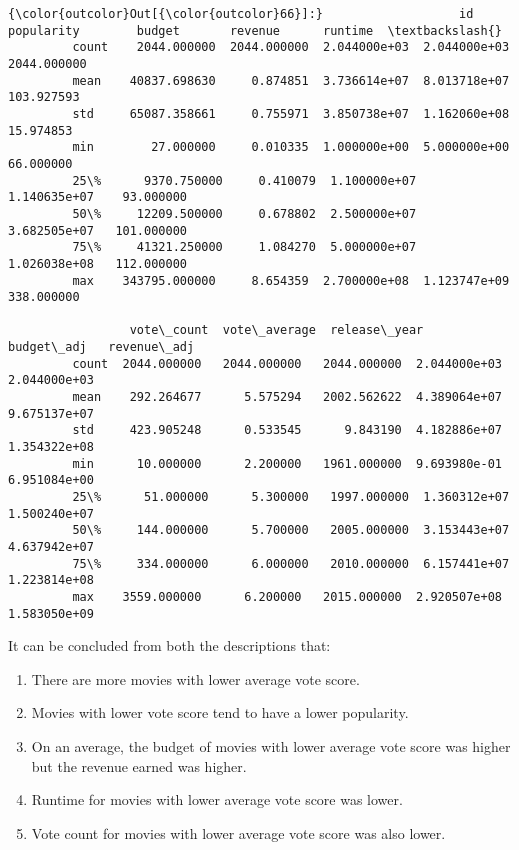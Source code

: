 \documentclass[11pt]{article}
\providecommand{\tightlist}{%
      \setlength{\itemsep}{0pt}\setlength{\parskip}{0pt}}
\begin{document}
\begin{Verbatim}[commandchars=\\\{\}]
{\color{outcolor}Out[{\color{outcolor}66}]:}                   id   popularity        budget       revenue      runtime  \textbackslash{}
         count    2044.000000  2044.000000  2.044000e+03  2.044000e+03  2044.000000   
         mean    40837.698630     0.874851  3.736614e+07  8.013718e+07   103.927593   
         std     65087.358661     0.755971  3.850738e+07  1.162060e+08    15.974853   
         min        27.000000     0.010335  1.000000e+00  5.000000e+00    66.000000   
         25\%      9370.750000     0.410079  1.100000e+07  1.140635e+07    93.000000   
         50\%     12209.500000     0.678802  2.500000e+07  3.682505e+07   101.000000   
         75\%     41321.250000     1.084270  5.000000e+07  1.026038e+08   112.000000   
         max    343795.000000     8.654359  2.700000e+08  1.123747e+09   338.000000   
         
                 vote\_count  vote\_average  release\_year    budget\_adj   revenue\_adj  
         count  2044.000000   2044.000000   2044.000000  2.044000e+03  2.044000e+03  
         mean    292.264677      5.575294   2002.562622  4.389064e+07  9.675137e+07  
         std     423.905248      0.533545      9.843190  4.182886e+07  1.354322e+08  
         min      10.000000      2.200000   1961.000000  9.693980e-01  6.951084e+00  
         25\%      51.000000      5.300000   1997.000000  1.360312e+07  1.500240e+07  
         50\%     144.000000      5.700000   2005.000000  3.153443e+07  4.637942e+07  
         75\%     334.000000      6.000000   2010.000000  6.157441e+07  1.223814e+08  
         max    3559.000000      6.200000   2015.000000  2.920507e+08  1.583050e+09  
\end{Verbatim}
            
    It can be concluded from both the descriptions that:

\begin{enumerate}
\def\labelenumi{\arabic{enumi}.}
\tightlist
\item
  There are more movies with lower average vote score.
\item
  Movies with lower vote score tend to have a lower popularity.
\item
  On an average, the budget of movies with lower average vote score was
  higher but the revenue earned was higher.
\item
  Runtime for movies with lower average vote score was lower.
\item
  Vote count for movies with lower average vote score was also lower.
\end{enumerate}
\end{document}
